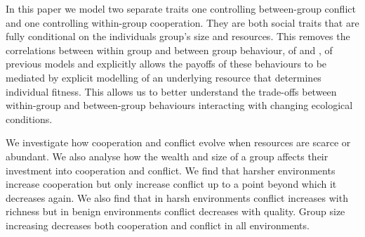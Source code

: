 In this paper we model two separate traits one controlling between-group conflict and one controlling within-group cooperation. They are both social traits that are fully conditional on the individuals group's size and resources. This removes the correlations between within group and between group behaviour, of \citet{choiCoevolutionParochial2007} and \citet{lehmannWarEvolution2008}, of previous models and explicitly allows the payoffs of these behaviours to be mediated by explicit modelling of an underlying resource that determines individual fitness. This allows us to better understand the trade-offs between within-group and between-group behaviours interacting with changing ecological conditions.

We investigate how cooperation and conflict evolve when resources are scarce or abundant. We also analyse how the wealth and size of a group affects their investment into cooperation and conflict. We find that harsher environments increase cooperation but only increase conflict up to a point beyond which it decreases again. We also find that in harsh environments conflict increases with richness but in benign environments conflict decreases with quality. Group size increasing decreases both cooperation and conflict in all environments. 